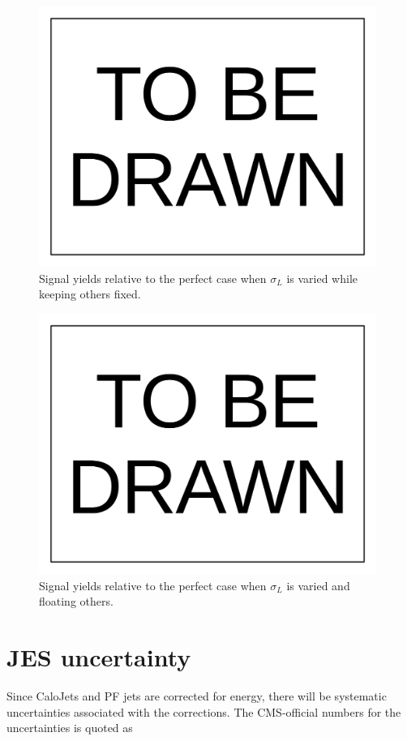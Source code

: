 \documentclass[10pt,a4paper,onecolumn]{article}
\begin{document}
\begin{figure}
\includegraphics[width=110mm]{ToBeDrawn.pdf}
\caption{Signal yields relative to the perfect case when $\sigma_L$ is varied while keeping others fixed.}
\label{Figure_RelativeYieldChangingSigmaROnly}
\end{figure}

\begin{figure}
\includegraphics[width=110mm]{ToBeDrawn.pdf}
\caption{Signal yields relative to the perfect case when $\sigma_L$ is varied and floating others.}
\label{Figure_RelativeYieldChangingAlphaLFloatingOthers}
\end{figure}


\section{JES uncertainty}

Since CaloJets and PF jets are corrected for energy, there will be systematic uncertainties associated with the corrections.
The CMS-official numbers for the uncertainties is quoted as
\end{document}
